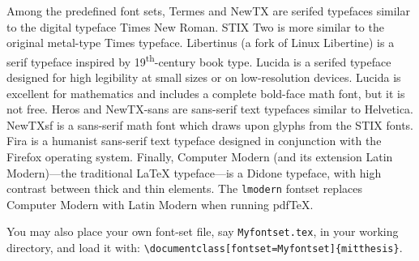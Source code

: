 \documentclass[11pt]{article}
\newcommand*\pdfTeX{pdf\TeX}
\begin{document}
Among the predefined font sets, Termes and NewTX are serifed typefaces similar to the digital typeface Times New Roman.  STIX Two is more similar to the original metal-type Times typeface. Libertinus (a fork of Linux Libertine) is a serif typeface inspired by 19\textsuperscript{th}-century book type. Lucida is a serifed typeface designed for high legibility at small sizes or on low-resolution devices. Lucida is excellent for mathematics and includes a complete bold-face math font, but it is not free. Heros and NewTX-sans are sans-serif text typefaces similar to Helvetica. NewTXsf is a sans-serif math font which draws upon glyphs from the STIX fonts. Fira is a humanist sans-serif text typeface designed in conjunction with the Firefox operating system. Finally, Computer Modern (and its extension Latin Modern)---the traditional \LaTeX{} typeface---is a Didone typeface, with high contrast between thick and thin elements.  The \texttt{lmodern} fontset replaces Computer Modern with Latin Modern when running \pdfTeX.

You may also place your own font-set file, say \texttt{Myfontset.tex}, in your working directory, and load it with:
\verb|\documentclass[fontset=Myfontset]{mitthesis}|.
\end{document}
